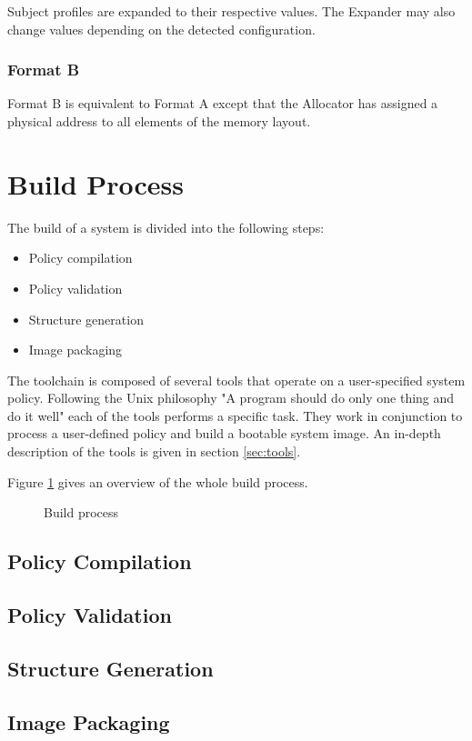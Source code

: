 \documentclass[a4paper,twoside,titlepage]{article}
\begin{document}
Subject profiles are expanded to their respective values. The Expander may also
change values depending on the detected configuration.

\subsubsection{Format B}
Format B is equivalent to Format A except that the Allocator has assigned a
physical address to all elements of the memory layout.

\section{Build Process}
The build of a system is divided into the following steps:

\begin{itemize}
	\item Policy compilation
	\item Policy validation
	\item Structure generation
	\item Image packaging
\end{itemize}

The toolchain is composed of several tools that operate on a user-specified
system policy. Following the Unix philosophy "A program should do only one
thing and do it well" each of the tools performs a specific task. They work in
conjunction to process a user-defined policy and build a bootable system image.
An in-depth description of the tools is given in section \ref{sec:tools}.

Figure \ref{fig:build-process} gives an overview of the whole build process.

\begin{figure}[h]
	\centering
	
	\caption{Build process}
	\label{fig:build-process}
\end{figure}

\subsection{Policy Compilation}
\subsection{Policy Validation}
\subsection{Structure Generation}
\subsection{Image Packaging}
\end{document}
